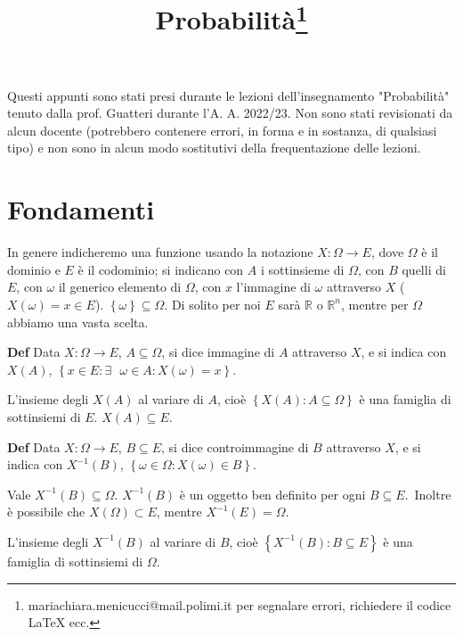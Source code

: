 \documentclass{article}
\title{Probabilità\footnote{mariachiara.menicucci@mail.polimi.it per segnalare errori, richiedere il codice LaTeX ecc.}}
\begin{document}
\maketitle
Questi appunti sono stati presi durante le lezioni dell'insegnamento "Probabilità" tenuto dalla prof. Guatteri durante l'A. A. 2022/23. Non sono stati revisionati da alcun docente (potrebbero contenere errori, in forma e in sostanza, di qualsiasi tipo) e non sono in alcun modo sostitutivi della frequentazione delle lezioni. 
\newpage
\tableofcontents

\newpage

\section{Fondamenti}

In genere indicheremo una funzione usando la notazione $X:\Omega \rightarrow
E$, dove $\Omega $ \`{e} il dominio e $E$ \`{e} il codominio; si indicano
con $A$ i sottinsieme di $\Omega $, con $B$ quelli di $E$, con $\omega $ il
generico elemento di $\Omega $, con $x$ l'immagine di $\omega $ attraverso $%
X $ ($X\left( \omega \right) =x\in E$). $\left\{ \omega \right\} \subseteq
\Omega $. Di solito per noi $E$ sar\`{a} $%
\mathbb{R}
$ o $%
\mathbb{R}
^{n}$, mentre per $\Omega $ abbiamo una vasta scelta.

\textbf{Def} Data $X:\Omega \rightarrow E$, $A\subseteq \Omega $, si dice
immagine di $A$ attraverso $X$, e si indica con $X\left( A\right) $, $%
\left\{ x\in E:\exists \text{ }\omega \in A:X\left( \omega \right)
=x\right\} $.

L'insieme degli $X\left( A\right) $ al variare di $A$, cio\`{e} $\left\{
X\left( A\right) :A\subseteq \Omega \right\} $ \`{e} una famiglia di
sottinsiemi di $E$. $X\left( A\right) \subseteq E$.

\textbf{Def} Data $X:\Omega \rightarrow E$, $B\subseteq E$, si dice
controimmagine di $B$ attraverso $X$, e si indica con $X^{-1}\left( B\right) 
$, $\left\{ \omega \in \Omega :X\left( \omega \right) \in B\right\} $.

Vale $X^{-1}\left( B\right) \subseteq \Omega $. $X^{-1}\left( B\right) $ 
\`{e} un oggetto ben definito per ogni $B\subseteq E$.\ Inoltre \`{e}
possibile che $X\left( \Omega \right) \subset E$, mentre $X^{-1}\left(
E\right) =\Omega $.

L'insieme degli $X^{-1}\left( B\right) $ al variare di $B$, cio\`{e} $%
\left\{ X^{-1}\left( B\right) :B\subseteq E\right\} $ \`{e} una famiglia di
sottinsiemi di $\Omega $.
\end{document}
